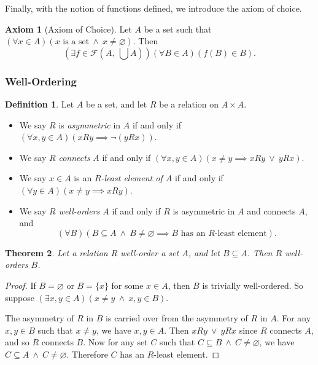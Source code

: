 \documentclass[a4paper,11pt]{article}
\theoremstyle{plain}
\newtheorem{thm}{Theorem}[subsection]
\theoremstyle{definition}
\newtheorem{defn}[thm]{Definition}
\newtheorem{axiom}{Axiom}
\theoremstyle{remark}
\begin{document}
Finally, with the notion of functions defined, we introduce the axiom of choice.

\begin{axiom}[Axiom of Choice]
\label{axiom:choice}
Let $A$ be a set such that $(\forall x \in A)(x \text{ is a set} \ \land \ x\neq\varnothing)$. Then
\[\left(\exists f \in \mathscr F\left(A,\ \bigcup A\right)\right)(\forall B\in A)(f(B) \in B).\]
\end{axiom}

\subsubsection{Well-Ordering}
\begin{defn}
\label{defn:wellorder}
Let $A$ be a set, and let $R$ be a relation on $A \times A$.
\begin{itemize}
\item We say $R$ is \textit{asymmetric} in $A$ if and only if $(\forall x,y\in A)(xRy \implies \lnot(yRx))$.
\item We say $R$ \textit{connects} $A$ if and only if $(\forall x,y\in A)(x\neq y \implies xRy \ \lor \ yRx)$.
\item We say $x\in A$ is an \textit{$R$-least element of $A$} if and only if $(\forall y\in A)(x\neq y \implies xRy)$.
\item We say \textit{$R$ well-orders $A$} if and only if $R$ is asymmetric in $A$ and connects $A$, and
\[(\forall B)(B \subseteq A \ \land \ B \neq \varnothing \implies B \text{ has an }R\text{-least element}).\]
\end{itemize}
\end{defn}

\begin{thm}
\label{thm:wellorderingsubset}
Let a relation $R$ well-order a set $A$, and let $B \subseteq A$. Then $R$ well-orders $B$.
\end{thm}
\begin{proof}
If $B = \varnothing$ or $B = \{x\}$ for some $x\in A$, then $B$ is trivially well-ordered. So suppose $(\exists x,y\in A)(x\neq y \ \land \ x,y\in B)$.

The asymmetry of $R$ in $B$ is carried over from the asymmetry of $R$ in $A$. For any $x,y\in B$ such that $x\neq y$, we have $x,y\in A$. Then $xRy \ \lor \ yRx$ since $R$ connects $A$, and so $R$ connects $B$. Now for any set $C$ such that $C \subseteq B \ \land \ C\neq\varnothing$, we have $C \subseteq A \ \land \ C\neq\varnothing$. Therefore $C$ has an $R$-least element.
\end{proof}
\end{document}
